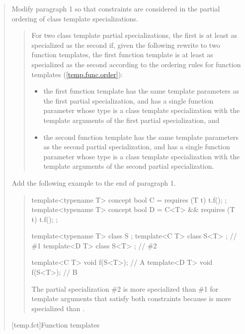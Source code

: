 \begin{quote}
Modify paragraph 1 so that constraints are considered in the
partial ordering of class template specializations. 

\begin{quote}
\pnum
For two class template partial specializations, the first is 
at least as specialized as the second if, given the following 
rewrite to two function templates, the first function template 
is at least as specialized as the second according to the ordering 
rules for function templates 
(\ref{temp.func.order}):
% 
\begin{itemize}
\item the first function template has the same template 
parameters  
as the first partial specialization, and has a single function parameter 
whose type is a class template specialization with the template
arguments of the first partial specialization, and

\item the second function template has the same template 
parameters  
as the second partial specialization, and has a single function parameter 
whose type is a class template specialization with the template
arguments of the second partial specialization.
\end{itemize}
\end{quote}

Add the following example to the end of paragraph 1.

\begin{quote}
\begin{addedblock}
\enterexample
\begin{codeblock}
template<typename T> concept bool C = requires (T t) { t.f(); };
template<typename T> concept bool D = C<T> && requires (T t) { t.f(); };


template<typename T> class S { };
template<C T> class S<T> { }; // \#1
template<D T> class S<T> { }; // \#2

template<C T> void f(S<T>); // A
template<D T> void f(S<T>); // B
\end{codeblock}
The partial specialization \#2 is more specialized than 
\#1 for template arguments that satisfy both constraints because 
 is more specialized than .
\exitexample
\end{addedblock}
\end{quote}


[temp.fct]{Function templates}


\end{quote}
